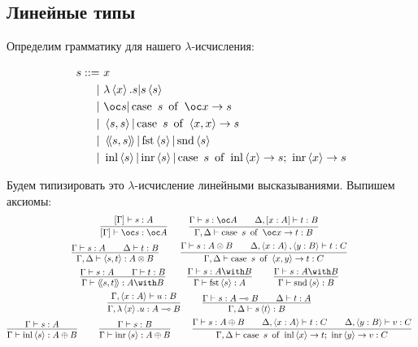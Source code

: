 \subsection{\texorpdfstring{Линейные типы}{Linear types}}
Определим грамматику для нашего $\lambda$-исчисления:
\begin{bnf}
\begin{alignat*}{2}
	s ::= &\ x \\
			  | &\ \lambda\pair{x}.s | s\pair{s} \\
			  | &\ \oc s | \caseb{s}{\oc x \rightarrow s} \\
			  | &\ \pair{s,s} | \caseb{s}{\pair{x,x} \rightarrow s} \\
			  | &\ \ppair{s,s} | \fst \pair{s} | \snd \pair{s} \\
			  | &\ \inl \pair{s} | \inr \pair{s}|
                    \casec{s}{\inl \pair{x} \rightarrow s}{\inr \pair{x} \rightarrow s}
\end{alignat*}
\end{bnf}
Будем типизировать это $\lambda$-исчисление линейными высказываниями. Выпишем аксиомы:
\begin{gather*}
	\infer[]
		{[\Gamma]\vdash \oc s : \oc A}
		{[\Gamma]\vdash s : A} \qquad
	\infer[]
		{\Gamma, \Delta\vdash \caseb{s}{\oc x \rightarrow t} : B}
		{\Gamma\vdash s : \oc A && \Delta, [x : A]\vdash t : B} \\
	\infer[]
		{\Gamma, \Delta\vdash \pair{s, t} : A \otimes B}
		{\Gamma \vdash s : A && \Delta\vdash t : B} \qquad
	\infer[]
		{\Gamma, \Delta \vdash \caseb{s}{\pair{x, y} \rightarrow t} : C}
		{\Gamma\vdash s : A \otimes B && \Delta, \pair{x : A}, \pair{y : B} \vdash t : C} \\
	\infer[]{\Gamma \vdash \ppair{s, t} : A \with B}{\Gamma \vdash s : A && \Gamma \vdash t : B} \qquad
	\infer[]{\Gamma \vdash \fst \pair{s} : A}{\Gamma \vdash s : A \with B} \qquad
	\infer[]{\Gamma \vdash \snd \pair{s} : B}{\Gamma \vdash s : A \with B} \\
	\infer[]{\Gamma, \lambda\pair{x}.u : A \multimap B}{\Gamma, \pair{x : A} \vdash u : B} \qquad
	\infer[]{\Gamma, \Delta \vdash  s \pair{t} : B}{\Gamma \vdash s : A \multimap B && \Delta \vdash t : A} \\
	\infer[]{\Gamma \vdash \inl \pair{s} : A \oplus B}{\Gamma \vdash s : A} \qquad
	\infer[]{\Gamma \vdash \inr \pair{s} : A \oplus B}{\Gamma \vdash s : B} \qquad
	\infer[]
		{\Gamma, \Delta \vdash \casec{s}{\inl \pair{x} \rightarrow t}{\inr \pair{y} \rightarrow v} : C}
		{\Gamma \vdash s : A \oplus B && \Delta, \pair{x : A} \vdash t : C && \Delta, \pair{y : B} \vdash v : C}
\end{gather*}

